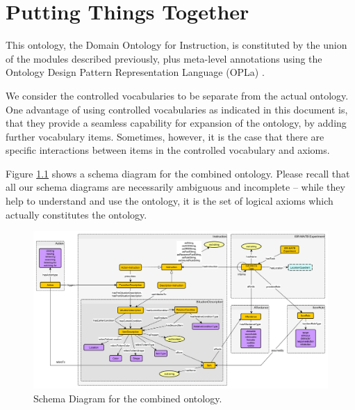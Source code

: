 \chapter{Putting Things Together}
\label{chap:ontology}

This ontology, the Domain Ontology for Instruction, is constituted by the union of the modules described previously, plus %
meta-level annotations using the Ontology Design Pattern Representation Language (OPLa) \cite{OPLa,OPLa-tool}.

We consider the controlled vocabularies to be separate from the actual ontology. One advantage of using controlled vocabularies as indicated in this document is, that they provide a seamless capability for expansion of the ontology, by adding further vocabulary items. Sometimes, however, it is the case that there are specific interactions between items in the controlled vocabulary and axioms. %

Figure \ref{fig:ontology} shows a schema diagram for the combined ontology. %
Please recall that all our schema diagrams are necessarily ambiguous and incomplete -- while they help to understand and use the ontology, it is the set of logical axioms which actually constitutes the ontology.

\begin{figure}[h!]
\begin{center}
\includegraphics[width=\textwidth]{resources/all-draft-7.pdf}
\end{center}
\caption{Schema Diagram for the combined ontology.}
\label{fig:ontology}
\end{figure}

